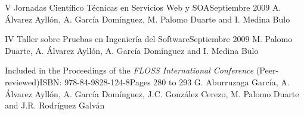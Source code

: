 {V Jornadas Científico Técnicas en Servicios Web y SOA}{Septiembre 2009}{}
{A. Álvarez Ayllón, A. García Domínguez, M. Palomo Duarte and I. Medina Bulo}

{IV Taller sobre Pruebas en Ingeniería del Software}{Septiembre 2009}{}
{M. Palomo Duarte, A. Álvarez Ayllón, A. García Domínguez and I. Medina Bulo}

{Included in the Proceedings of the \textit{FLOSS International Conference} (Peer-reviewed)}{ISBN: 978-84-9828-124-8}{Pages 280 to 293}
{G. Aburruzaga García, A. Álvarez Ayllón, A. García Domínguez, J.C. González Cerezo, M. Palomo Duarte and J.R. Rodríguez Galván}